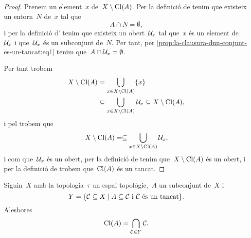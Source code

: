 \documentclass[../topologia.tex]{subfiles}
\begin{document}
    \begin{proof}
         Prenem un element~\(x\) de~\(X\setminus\operatorname{Cl}(A)\).
         Per la definició de  tenim que existeix un entorn~\(N\) de~\(x\) tal que
         \begin{equation}
             \label{prop:la-clausura-dun-conjunt-es-un-tancat:eq1}
             A\cap N=\emptyset,
         \end{equation}
         i per la definició d' tenim que existeix un obert~\(\mathcal{U}_{x}\) tal que~\(x\) és un element de~\(\mathcal{U}_{x}\) i que~\(\mathcal{U}_{x}\) és un subconjunt de~\(N\).
         Per tant, per \eqref{prop:la-clausura-dun-conjunt-es-un-tancat:eq1} tenim que~\(A\cap\mathcal{U}_{x}=\emptyset\).

         Per tant trobem
         \begin{align*}
             X\setminus\operatorname{Cl}(A)&=\bigcup_{x\in X\setminus\operatorname{Cl}(A)}\{x\} \\
             &\subseteq\bigcup_{x\in X\setminus\operatorname{Cl}(A)}\mathcal{U}_{x}\subseteq X\setminus\operatorname{Cl}(A),
         \end{align*}
         i pel  trobem que
         \[
             X\setminus\operatorname{Cl}(A)=\subseteq\bigcup_{x\in X\setminus\operatorname{Cl}(A)}\mathcal{U}_{x},
         \]
         i com que~\(\mathcal{U}_{x}\) és un obert, per la definició de  tenim que~\(X\setminus\operatorname{Cl}(A)\) és un obert, i per la definició de  trobem que~\(\operatorname{Cl}(A)\) és un tancat.
    \end{proof}
    \begin{proposition}
        \label{prop:la-clausura-dun-conjunt-es-linterseccio-de-tots-els-tancats-que-contenen-el-conjunt}
        Siguin~\(X\) amb la topologia~\(\tau\) un espai topològic,~\(A\) un subconjunt de~\(X\) i
        \[
            Y=\{\mathcal{C}\subseteq X\mid A\subseteq\mathcal{C}\text{ i }\mathcal{C}\text{ és un tancat}\}.
        \]
        Aleshores
        \[
            \operatorname{Cl}(A)=\bigcap_{\mathcal{C}\in Y}\mathcal{C}.
        \]
    \end{proposition}
\end{document}
